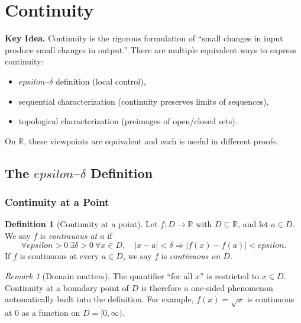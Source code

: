 \documentclass[12pt]{article}
\numberwithin{equation}{section}
\def\abs#1{|#1|}
\def\eps{epsilon}
\newcommand{\RR}{\mathbb{R}}
\DeclarePairedDelimiter{\abs}{\lvert}{\rvert}
\newcommand{\eps}{\varepsilon}               %
\theoremstyle{plain}
\theoremstyle{definition}
\newtheorem{definition}[theorem]{Definition}
\theoremstyle{remark}
\newtheorem{remark}[theorem]{Remark}
\newenvironment{keyidea}{\begin{tcolorbox}\textbf{Key Idea.}}{\end{tcolorbox}}
\begin{document}
\newpage


\section{Continuity}

\begin{keyidea}
Continuity is the rigorous formulation of ``small changes in input produce small changes in output.''
There are multiple equivalent ways to express continuity:
\begin{itemize}
\item $\eps$--$\delta$ definition (local control),
\item sequential characterization (continuity preserves limits of sequences),
\item topological characterization (preimages of open/closed sets).
\end{itemize}
On $\RR$, these viewpoints are equivalent and each is useful in different proofs.
\end{keyidea}

\subsection{The \texorpdfstring{$\eps$--$\delta$}{epsilon-delta} Definition}

\subsubsection{Continuity at a Point}

\begin{definition}[Continuity at a point]\label{def:cont-point}
Let $f:D\to\RR$ with $D\subseteq\RR$, and let $a\in D$.
We say $f$ is \emph{continuous at $a$} if
\[
\forall \eps>0\ \exists \delta>0\ \forall x\in D,\quad \abs{x-a}<\delta \Rightarrow \abs{f(x)-f(a)}<\eps.
\]
If $f$ is continuous at every $a\in D$, we say $f$ is \emph{continuous on $D$}.
\end{definition}

\begin{remark}[Domain matters]
The quantifier ``for all $x$'' is restricted to $x\in D$.
Continuity at a boundary point of $D$ is therefore a one-sided phenomenon automatically built into the definition.
For example, $f(x)=\sqrt{x}$ is continuous at $0$ as a function on $D=[0,\infty)$.
\end{remark}
\end{document}
